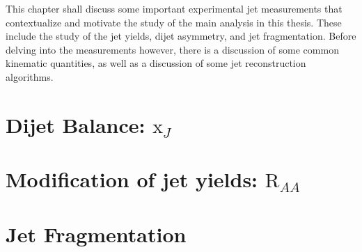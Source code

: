 
This chapter shall discuss some important experimental jet measurements that contextualize and motivate the study of the main analysis in this thesis.
These include the study of the jet yields, dijet asymmetry, and jet fragmentation.
Before delving into the measurements however, there is a discussion of some common kinematic quantities, as well as a discussion of some jet reconstruction algorithms.

%

%

\section{Dijet Balance: $\mathrm{x}_{J}$}
\label{sec:xj}


\section{Modification of jet yields: $\mathrm{R}_{AA}$}
\label{sec:jet_raa}


\section{Jet Fragmentation}
\label{sec:jet_ff}








